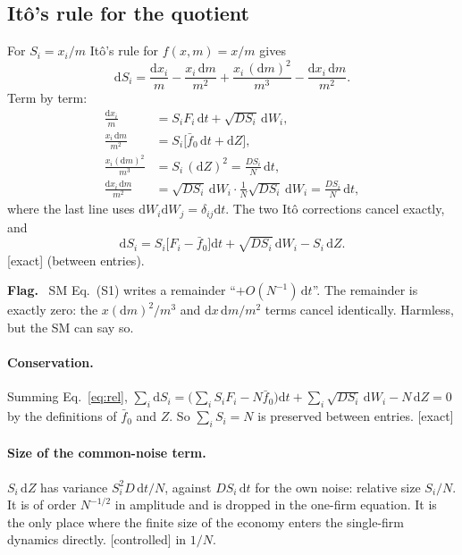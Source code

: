 \documentclass[11pt]{article}
\newcommand{\fb}{\bar f}
\newcommand{\dd}{\mathrm d}
\newcommand{\exact}{\textsf{\small[exact]}}
\newcommand{\controlled}{\textsf{\small[controlled]}}
\newenvironment{flag}{\par\medskip\noindent\textcolor{red!70!black}{\textbf{Flag.}}\ }{\par\medskip}
\begin{document}
\subsection{It\^o's rule for the quotient}

For $S_i=x_i/m$ It\^o's rule for $f(x,m)=x/m$ gives
\begin{equation}
\dd S_i=\frac{\dd x_i}{m}-\frac{x_i\,\dd m}{m^2}+\frac{x_i\,(\dd m)^2}{m^3}-\frac{\dd x_i\,\dd m}{m^2}.
\end{equation}
Term by term:
\begin{align}
\frac{\dd x_i}{m}&=S_iF_i\,\dd t+\sqrt{DS_i}\,\dd W_i,\\
\frac{x_i\,\dd m}{m^2}&=S_i\big[\fb_0\,\dd t+\dd Z\big],\\
\frac{x_i(\dd m)^2}{m^3}&=S_i\,(\dd Z)^2=\frac{DS_i}{N}\,\dd t,\\
\frac{\dd x_i\,\dd m}{m^2}&=\sqrt{DS_i}\,\dd W_i\cdot\frac1N\sqrt{DS_i}\,\dd W_i=\frac{DS_i}{N}\,\dd t ,
\end{align}
where the last line uses $\dd W_i\dd W_j=\delta_{ij}\dd t$.  The two It\^o corrections cancel exactly, and
\begin{equation}
\boxed{\dd S_i=S_i\big[F_i-\fb_0\big]\dd t+\sqrt{DS_i}\,\dd W_i-S_i\,\dd Z .}
\label{eq:rel}
\end{equation}
\exact{} (between entries).

\begin{flag}
SM Eq.~(S1) writes a remainder ``$+O(N^{-1})\,\dd t$''.  The remainder is exactly zero: the
$x(\dd m)^2/m^3$ and $\dd x\,\dd m/m^2$ terms cancel identically.  Harmless, but the SM can say so.
\end{flag}

\paragraph{Conservation.}  Summing Eq.~\eqref{eq:rel},
$\sum_i\dd S_i=\big(\sum_iS_iF_i-N\fb_0\big)\dd t+\sum_i\sqrt{DS_i}\,\dd W_i-N\,\dd Z=0$
by the definitions of $\fb_0$ and $Z$.  So $\sum_iS_i=N$ is preserved between entries.  \exact

\paragraph{Size of the common-noise term.}  $S_i\,\dd Z$ has variance $S_i^2D\,\dd t/N$, against $DS_i\,\dd t$
for the own noise: relative size $S_i/N$.  It is of order $N^{-1/2}$ in amplitude and is dropped in the
one-firm equation.  It is the only place where the finite size of the economy enters the single-firm
dynamics directly.  \controlled{} in $1/N$.
\end{document}
